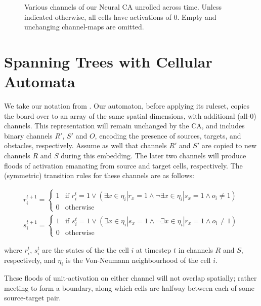 \documentclass{article}
\begin{document}
\begin{appendices}
\begin{figure}
\begin{tikzpicture}[scale=.9,every node/.style={minimum size=1cm},on grid]
\end{tikzpicture}
\caption{Various channels of our Neural CA unrolled across time. Unless indicated otherwise, all cells have activations of $0$. Empty and unchanging channel-maps are omitted.}
\label{fig:floods}
\end{figure}
\section{Spanning Trees with Cellular Automata}

\label{app:CA}

We take our notation from \cite{behring2001algorithm}.
Our automaton, before applying its ruleset, copies the board over to an array of the same spatial dimensions, with additional (all-$0$) channels.
This representation will remain unchanged by the CA, and includes binary channels $R'$, $S'$ and $O$, encoding the presence of sources, targets, and obstacles, respectively.
Assume as well that channels $R'$ and $S'$ are copied to new channels $R$ and $S$ during this embedding. The later two channels will produce floods of activation emanating from source and target cells, respectively. The (symmetric) transition rules for these channels are as follows:

\begin{align*}
r_i^{t + 1} = 
	\begin{cases}
		1 & \text{if } r_i^t = 1 %
		\vee 
			( \exists x \in \eta_i | r_x = 1 \wedge \neg\exists x\in \eta_i | s_x = 1 \wedge o_i \neq 1) \\
		0 & \text{otherwise}
	\end{cases} \\
s_i^{t + 1} = 
	\begin{cases}
		1 & \text{if } s_i^t = 1 %
		\vee 
			(\exists x \in \eta_i | s_x = 1 \wedge \neg\exists x\in \eta_i | r_x = 1\wedge o_i \neq 1) \\
		0 & \text{otherwise}
	\end{cases}
\end{align*}

where $r_i^t$, $s_i^t$ are the states of the the cell $i$ at timestep $t$ in channels $R$ and $S$, respectively, and $\eta_i$ is the Von-Neumann neighbourhood of the cell $i$.

These floods of unit-activation on either channel will not overlap spatially; rather meeting to form a boundary, along which cells are halfway between each of some source-target pair.


\end{appendices}
\end{document}
